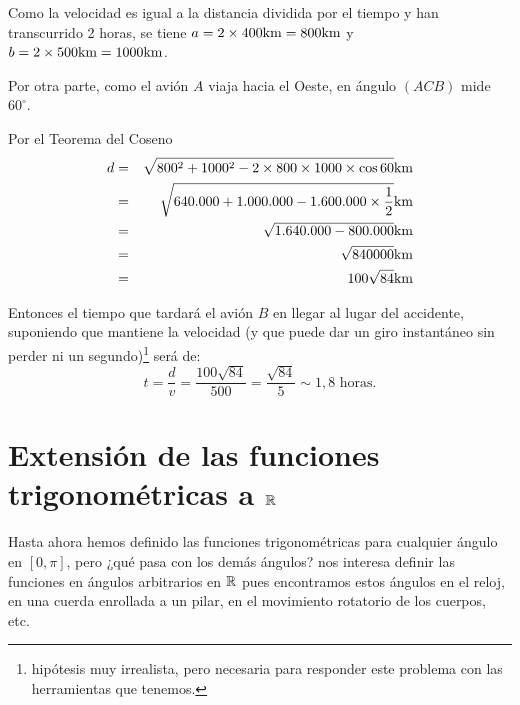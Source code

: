 \begin{center}
\end{center}

Como  la velocidad es igual a la distancia dividida por el tiempo y han transcurrido 2 horas, se tiene
$a=2\times400\textup{km}=800\textup{km}$ y $b=2\times500\textup{km}=1000\textup{km}$.

Por otra parte, como el avión $A$ viaja hacia el Oeste, en ángulo $(ACB)$ mide $60^\circ$.

 Por el Teorema del Coseno 
\begin{eqnarray*}
d&=&\sqrt{800^2+1000^2-2\times 800\times 1000\times\cos 60}\textup{km}\\
&=&\sqrt{640.000+1.000.000-1.600.000\times\frac{1}{2}}\textup{km}\\
&=&\sqrt{1.640.000-800.000}\textup{km}\\
&=&\sqrt{840000}\textup{km}\\
&=&100\sqrt{84}\textup{km}
\end{eqnarray*}

Entonces el tiempo que tardará el avión $B$ en llegar al lugar del accidente, suponiendo que mantiene la velocidad (y que puede dar un giro instantáneo sin perder ni un segundo)\footnote{hipótesis muy irrealista, pero necesaria para responder este problema con las herramientas que tenemos.} será de:
\[
t=\frac{d}{v}=\frac{100\sqrt{84}}{500}=\frac{\sqrt{84}}{5}\sim1,8\mbox{ horas.}
\]

\section{Extensión de las funciones trigonométricas a $\mathbb{R}$}


\vspace{.5cm}

Hasta ahora hemos definido las funciones trigonométricas para cualquier ángulo en $[0,\pi]$, pero ¿qué pasa con los demás ángulos? nos interesa definir las funciones en ángulos arbitrarios en $\mathbb{R}$ pues encontramos estos ángulos en el reloj, en una cuerda enrollada a un pilar, en el movimiento rotatorio de los cuerpos, etc.

